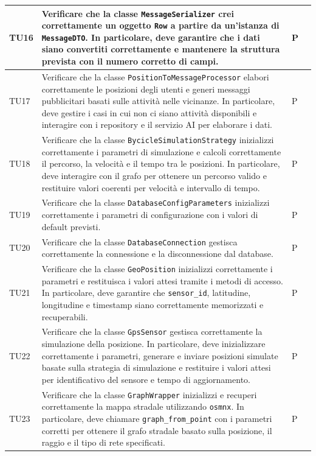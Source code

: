 \documentclass[10pt]{article}
\begin{document}
\begin{justify}
\begin{longtable}{|>{\centering\arraybackslash}m{2cm}|>{\centering\arraybackslash}m{7cm}|>{\centering\arraybackslash}m{2cm}|>{\centering\arraybackslash}m{2cm}|}
\hline
TU16 & Verificare che la classe \texttt{MessageSerializer} crei correttamente un oggetto \texttt{Row} a partire da un'istanza di \texttt{MessageDTO}. In particolare, deve garantire che i dati siano convertiti correttamente e mantenere la struttura prevista con il numero corretto di campi. & P \\
\hline
TU17 & Verificare che la classe \texttt{PositionToMessageProcessor} elabori correttamente le posizioni degli utenti e generi messaggi pubblicitari basati sulle attività nelle vicinanze. In particolare, deve gestire i casi in cui non ci siano attività disponibili e interagire con i repository e il servizio AI per elaborare i dati. & P \\
\hline
TU18 & Verificare che la classe \texttt{BycicleSimulationStrategy} inizializzi correttamente i parametri di simulazione e calcoli correttamente il percorso, la velocità e il tempo tra le posizioni. In particolare, deve interagire con il grafo per ottenere un percorso valido e restituire valori coerenti per velocità e intervallo di tempo. & P \\
\hline
TU19 & Verificare che la classe \texttt{DatabaseConfigParameters} inizializzi correttamente i parametri di configurazione con i valori di default previsti. & P \\
\hline
TU20 & Verificare che la classe \texttt{DatabaseConnection} gestisca correttamente la connessione e la disconnessione dal database. & P \\
\hline
TU21 & Verificare che la classe \texttt{GeoPosition} inizializzi correttamente i parametri e restituisca i valori attesi tramite i metodi di accesso. In particolare, deve garantire che \texttt{sensor\_id}, latitudine, longitudine e timestamp siano correttamente memorizzati e recuperabili. & P \\
\hline
TU22 & Verificare che la classe \texttt{GpsSensor} gestisca correttamente la simulazione della posizione. In particolare, deve inizializzare correttamente i parametri, generare e inviare posizioni simulate basate sulla strategia di simulazione e restituire i valori attesi per identificativo del sensore e tempo di aggiornamento. & P \\
\hline
TU23 & Verificare che la classe \texttt{GraphWrapper} inizializzi e recuperi correttamente la mappa stradale utilizzando \texttt{osmnx}. In particolare, deve chiamare \texttt{graph\_from\_point} con i parametri corretti per ottenere il grafo stradale basato sulla posizione, il raggio e il tipo di rete specificati. & P \\

\end{longtable}
\end{justify}
\end{document}
